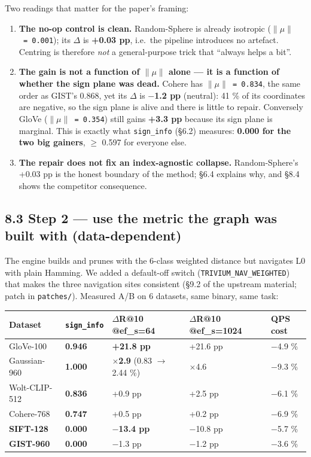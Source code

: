 \documentclass[
  10pt,
]{article}
\newcounter{none} %
\providecommand{\tightlist}{%
  \setlength{\itemsep}{0pt}\setlength{\parskip}{0pt}}
\begin{document}
Two readings that matter for the paper's framing:

\begin{enumerate}
\def\labelenumi{\arabic{enumi}.}
\tightlist
\item
  \textbf{The no-op control is clean.} Random-Sphere is already
  isotropic (\texttt{$\|$$\mu$$\|$\ =\ 0.001}); its $\Delta$ is \textbf{+0.03 pp},
  i.e.~the pipeline introduces no artefact. Centring is therefore
  \emph{not} a general-purpose trick that ``always helps a bit''.
\item
  \textbf{The gain is not a function of \texttt{$\|$$\mu$$\|$} alone --- it is a
  function of whether the sign plane was dead.} Cohere has
  \texttt{$\|$$\mu$$\|$\ =\ 0.834}, the same order as GIST's 0.868, yet its $\Delta$ is
  \textbf{$-$1.2 pp} (neutral): 41 \% of its coordinates are negative, so
  the sign plane is alive and there is little to repair. Conversely
  GloVe (\texttt{$\|$$\mu$$\|$\ =\ 0.354}) still gains \textbf{+3.3 pp} because
  its sign plane is marginal. This is exactly what \texttt{sign\_info}
  (§6.2) measures: \textbf{0.000 for the two big gainers}, $\geq$ 0.597 for
  everyone else.
\item
  \textbf{The repair does not fix an index-agnostic collapse.}
  Random-Sphere's +0.03 pp is the honest boundary of the method; §6.4
  explains why, and §8.4 shows the competitor consequence.
\end{enumerate}

\subsection{8.3 Step 2 --- use the metric the graph was built with
(data-dependent)}\label{step-2-use-the-metric-the-graph-was-built-with-data-dependent}

The engine builds and prunes with the 6-class weighted distance but
navigates L0 with plain Hamming. We added a default-off switch
(\texttt{TRIVIUM\_NAV\_WEIGHTED}) that makes the three navigation sites
consistent (§9.2 of the upstream material; patch in \texttt{patches/}).
Measured A/B on 6 datasets, same binary, same task:

{\def\LTcaptype{none} %
\begin{longtable}[]{@{}lllll@{}}
\toprule\noalign{}
Dataset & \texttt{sign\_info} & $\Delta$R@10 @ef\_s=64 & $\Delta$R@10 @ef\_s=1024 &
QPS cost \\
\midrule\noalign{}
\endhead
\bottomrule\noalign{}
\endlastfoot
GloVe-100 & \textbf{0.946} & \textbf{+21.8 pp} & +21.6 pp & $-$4.9 \% \\
Gaussian-960 & \textbf{1.000} & \textbf{$\times$2.9} (0.83 $\rightarrow$ 2.44 \%) & $\times$4.6 &
$-$9.3 \% \\
Wolt-CLIP-512 & \textbf{0.836} & +0.9 pp & +2.5 pp & $-$6.1 \% \\
Cohere-768 & \textbf{0.747} & +0.5 pp & +0.2 pp & $-$6.9 \% \\
\textbf{SIFT-128} & \textbf{0.000} & \textbf{$-$13.4 pp} & $-$10.8 pp & $-$5.7
\% \\
\textbf{GIST-960} & \textbf{0.000} & $-$1.3 pp & $-$1.2 pp & $-$3.6 \% \\
\end{longtable}
}
\end{document}

